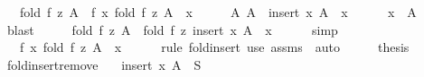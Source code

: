 \begin{isabellebody}
\ \ \ {\isachardoublequoteopen}fold\ f\ z\ A\ {\isacharequal}{\kern0pt}\ f\ x\ {\isacharparenleft}{\kern0pt}fold\ f\ z\ {\isacharparenleft}{\kern0pt}A\ {\isacharminus}{\kern0pt}\ {\isacharbraceleft}{\kern0pt}x{\isacharbraceright}{\kern0pt}{\isacharparenright}{\kern0pt}{\isacharparenright}{\kern0pt}{\isachardoublequoteclose}\isanewline
%
\isadelimproof
%
\endisadelimproof
%
\isatagproof
{}\isamarkupfalse%
\ {\isacharminus}{\kern0pt}\isanewline
\ \ \isamarkupfalse%
\ A{\isacharcolon}{\kern0pt}\ {\isachardoublequoteopen}A\ {\isacharequal}{\kern0pt}\ insert\ x\ {\isacharparenleft}{\kern0pt}A\ {\isacharminus}{\kern0pt}\ {\isacharbraceleft}{\kern0pt}x{\isacharbraceright}{\kern0pt}{\isacharparenright}{\kern0pt}{\isachardoublequoteclose}\isanewline
\ \ \ \ \isamarkupfalse%
\ {\isacartoucheopen}x\ {\isasymin}\ A{\isacartoucheclose}\ \isamarkupfalse%
\ blast\isanewline
\ \ \isamarkupfalse%
\ \isamarkupfalse%
\ {\isachardoublequoteopen}fold\ f\ z\ A\ {\isacharequal}{\kern0pt}\ fold\ f\ z\ {\isacharparenleft}{\kern0pt}insert\ x\ {\isacharparenleft}{\kern0pt}A\ {\isacharminus}{\kern0pt}\ {\isacharbraceleft}{\kern0pt}x{\isacharbraceright}{\kern0pt}{\isacharparenright}{\kern0pt}{\isacharparenright}{\kern0pt}{\isachardoublequoteclose}\isanewline
\ \ \ \ \isamarkupfalse%
\ simp\isanewline
\ \ \isamarkupfalse%
\ \isamarkupfalse%
\ {\isachardoublequoteopen}{\isasymdots}\ {\isacharequal}{\kern0pt}\ f\ x\ {\isacharparenleft}{\kern0pt}fold\ f\ z\ {\isacharparenleft}{\kern0pt}A\ {\isacharminus}{\kern0pt}\ {\isacharbraceleft}{\kern0pt}x{\isacharbraceright}{\kern0pt}{\isacharparenright}{\kern0pt}{\isacharparenright}{\kern0pt}{\isachardoublequoteclose}\isanewline
\ \ \ \ \isamarkupfalse%
\ {\isacharparenleft}{\kern0pt}rule\ fold{\isacharunderscore}{\kern0pt}insert{\isacharparenright}{\kern0pt}\ {\isacharparenleft}{\kern0pt}use\ assms\ \ {\isacartoucheopen}auto{\isacartoucheclose}{\isacharparenright}{\kern0pt}\isanewline
\ \ \isamarkupfalse%
\ \isamarkupfalse%
\ {\isacharquery}{\kern0pt}thesis\ \isacommand{{\isachardot}{\kern0pt}}\isamarkupfalse%
\isanewline
{}\isamarkupfalse%
%
\endisatagproof
{\isafoldproof}%
%
\isadelimproof
\isanewline
%
\endisadelimproof
\isanewline
{}\isamarkupfalse%
\ fold{\isacharunderscore}{\kern0pt}insert{\isacharunderscore}{\kern0pt}remove{\isacharcolon}{\kern0pt}\isanewline
\ \ \ {\isachardoublequoteopen}insert\ x\ A\ {\isasymsubseteq}\ S{\isachardoublequoteclose}\isanewline

\end{isabellebody}
